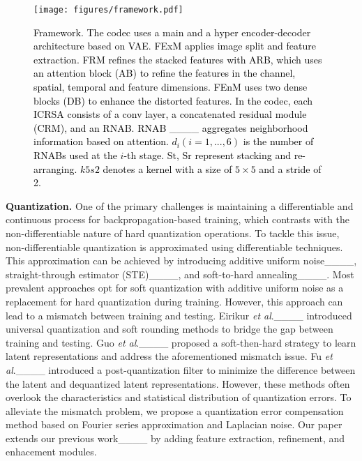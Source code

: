 \begin{figure*}
	\centering
	\begin{minipage}{\textwidth}
	\centering
	\texttt{[image: figures/framework.pdf]}
	\caption{\textcolor{black}{Framework. The codec uses a main and a hyper encoder-decoder architecture based on VAE. FExM applies image split and feature extraction. FRM refines the stacked features with ARB, which uses an attention block (AB) to refine the features in the channel, spatial, temporal and feature dimensions. FEnM uses two dense blocks (DB) to enhance the distorted features. In the codec, each ICRSA consists of a conv layer, a concatenated residual module (CRM), and an RNAB. RNAB ____ aggregates neighborhood information based on attention. $d_i(i=1,...,6)$ is the number of RNABs used at the $i$-th stage. $\mathrm{St}$, $\mathrm{Sr}$ represent stacking and re-arranging. $k5s2$ denotes a kernel with a size of $5 \times 5$ and a stride of 2. }}
	\label{fig:framework}
	\end{minipage}
\end{figure*}

\textbf{Quantization.} One of the primary challenges is maintaining a differentiable and continuous process for backpropagation-based training, which contrasts with the non-differentiable nature of hard quantization operations. To tackle this issue, non-differentiable quantization is approximated using differentiable techniques. This approximation can be achieved by introducing additive uniform noise____, straight-through estimator (STE)____, and soft-to-hard annealing____. Most prevalent approaches opt for soft quantization with additive uniform noise as a replacement for hard quantization during training. However, this approach can lead to a mismatch between training and testing. Eirikur \textit{et al}.____ introduced universal quantization and soft rounding methods to bridge the gap between training and testing. Guo \textit{et al}.____ proposed a soft-then-hard strategy to learn latent representations and address the aforementioned mismatch issue. Fu \textit{et al}.____ introduced a post-quantization filter to minimize the difference between the latent and dequantized latent representations. However, these methods often overlook the characteristics and statistical distribution of quantization errors. To alleviate the mismatch problem, we propose a quantization error compensation method based on Fourier series approximation and Laplacian noise. Our paper extends our previous work____ by adding feature extraction, refinement, and enhacement modules.